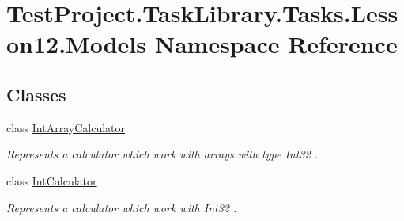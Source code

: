 \hypertarget{namespace_test_project_1_1_task_library_1_1_tasks_1_1_lesson12_1_1_models}{}\section{Test\+Project.\+Task\+Library.\+Tasks.\+Lesson12.\+Models Namespace Reference}
\label{namespace_test_project_1_1_task_library_1_1_tasks_1_1_lesson12_1_1_models}
\subsection*{Classes}
\begin{DoxyCompactItemize}
\item 
class \mbox{\hyperlink{class_test_project_1_1_task_library_1_1_tasks_1_1_lesson12_1_1_models_1_1_int_array_calculator}{Int\+Array\+Calculator}}
\begin{DoxyCompactList}\small\item\em Represents a calculator which work with arrays with type Int32 . \end{DoxyCompactList}\item 
class \mbox{\hyperlink{class_test_project_1_1_task_library_1_1_tasks_1_1_lesson12_1_1_models_1_1_int_calculator}{Int\+Calculator}}
\begin{DoxyCompactList}\small\item\em Represents a calculator which work with Int32 . \end{DoxyCompactList}\end{DoxyCompactItemize}
